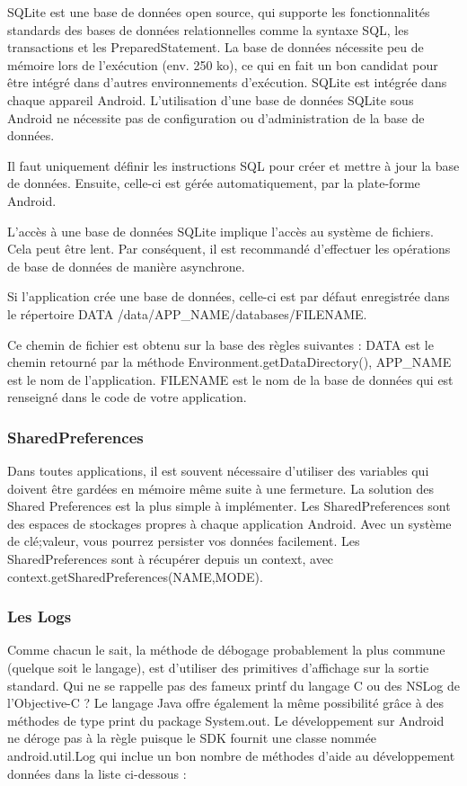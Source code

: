  SQLite est une base de données open source, qui supporte les fonctionnalités standards des bases de données relationnelles comme la syntaxe SQL, les transactions et les PreparedStatement. La base de données nécessite peu de mémoire lors de l'exécution (env. 250 ko), ce qui en fait un bon candidat pour être intégré dans d'autres environnements d'exécution.
SQLite est intégrée dans chaque appareil Android. L'utilisation d'une base de données SQLite sous Android ne nécessite pas de configuration ou d'administration de la base de données. 
 
Il faut uniquement définir les instructions SQL pour créer et mettre à jour la base de données. Ensuite, celle-ci est gérée automatiquement, par la plate-forme Android. 
 
L'accès à une base de données SQLite implique l'accès au système de fichiers. Cela peut être lent. Par conséquent, il est recommandé d'effectuer les opérations de base de données de manière asynchrone. 
 
Si l’application crée une base de données, celle-ci est par défaut enregistrée dans le répertoire DATA /data/APP\_NAME/databases/FILENAME. 
 
Ce chemin de fichier est obtenu sur la base des règles suivantes : DATA est le chemin retourné par la méthode Environment.getDataDirectory(), APP\_NAME est le nom de l’application. FILENAME est le nom de la base de données qui est renseigné dans le code de votre application.\cite{sqlite}


\subsubsection{SharedPreferences}

Dans toutes applications, il est souvent nécessaire d'utiliser des variables qui doivent être gardées en mémoire même suite à une fermeture. La solution des Shared Preferences est la plus simple à implémenter.
Les SharedPreferences sont des espaces de stockages propres à chaque application Android. Avec un système de clé;valeur, vous pourrez persister vos données facilement.
Les SharedPreferences sont à récupérer depuis un context, avec context.getSharedPreferences(NAME,MODE).\cite{sharedpreference} 

\subsubsection{Les Logs}

 Comme chacun le sait, la méthode de débogage probablement la plus commune (quelque soit le langage), est d'utiliser des primitives d'affichage sur la sortie standard. Qui ne se rappelle pas des fameux printf du langage C ou des NSLog de l'Objective-C ? Le langage Java offre également la même possibilité grâce à des méthodes de type print du package System.out.
Le développement sur Android ne déroge pas à la règle puisque le SDK fournit une classe nommée android.util.Log qui inclue un bon nombre de méthodes d'aide au développement données dans la liste ci-dessous :\cite{log}

